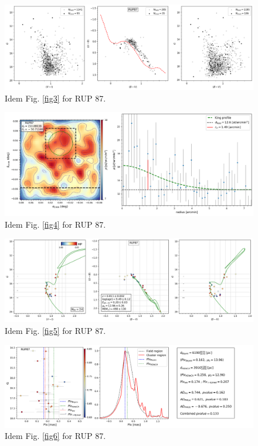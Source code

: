 \documentclass[draft]{aa}
\begin{document}
\begin{figure}[ht]
    \centering
    \includegraphics[width=\hsize]{../figs/obs_RUP87.png}
    \caption{Idem Fig. \ref{fig3} for RUP 87.}
    \label{fig23}
\end{figure}
\begin{figure}[ht]
    \centering
    \includegraphics[width=\hsize]{../figs/dmap_rup87.png}
    \caption{Idem Fig. \ref{fig4} for RUP 87.}
    \label{fig24}
\end{figure}
\begin{figure}[ht]
    \centering
    \includegraphics[width=\hsize]{../figs/cmds_rup87.png}
    \caption{Idem Fig. \ref{fig5} for RUP 87.}
    \label{fig25}
\end{figure}
\begin{figure}[ht]
    \centering
    \includegraphics[width=\hsize]{../figs/plx_RUP87.png}
    \caption{Idem Fig. \ref{fig6} for RUP 87.}
    \label{fig26}
\end{figure}
\end{document}
